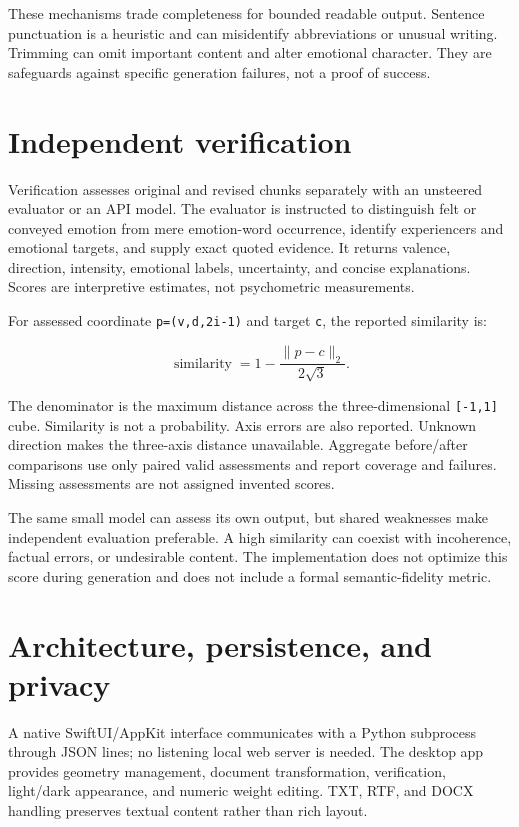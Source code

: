 \documentclass[manuscript,screen,nonacm]{acmart}
\begin{document}
These mechanisms trade completeness for bounded readable output.
Sentence punctuation is a heuristic and can misidentify abbreviations or
unusual writing. Trimming can omit important content and alter emotional
character. They are safeguards against specific generation failures, not
a proof of success.

\section{Independent verification}\label{independent-verification}

Verification assesses original and revised chunks separately with an
unsteered evaluator or an API model. The evaluator is instructed to
distinguish felt or conveyed emotion from mere emotion-word occurrence,
identify experiencers and emotional targets, and supply exact quoted
evidence. It returns valence, direction, intensity, emotional labels,
uncertainty, and concise explanations. Scores are interpretive
estimates, not psychometric measurements.

For assessed coordinate \nolinkurl{p=(v,d,2i-1)} and target \nolinkurl{c}, the
reported similarity is:

\[\operatorname{similarity}=1-\frac{\lVert p-c\rVert_2}{2\sqrt3}.\]

The denominator is the maximum distance across the three-dimensional
\texttt{{[}-1,1{]}} cube. Similarity is not a probability. Axis errors
are also reported. Unknown direction makes the three-axis distance
unavailable. Aggregate before/after comparisons use only paired valid
assessments and report coverage and failures. Missing assessments are
not assigned invented scores.

The same small model can assess its own output, but shared weaknesses
make independent evaluation preferable. A high similarity can coexist
with incoherence, factual errors, or undesirable content. The
implementation does not optimize this score during generation and does
not include a formal semantic-fidelity metric.

\section{Architecture, persistence, and
privacy}\label{architecture-persistence-and-privacy}

A native SwiftUI/AppKit interface communicates with a Python subprocess
through JSON lines; no listening local web server is needed. The desktop
app provides geometry management, document transformation, verification,
light/dark appearance, and numeric weight editing. TXT, RTF, and DOCX
handling preserves textual content rather than rich layout.
\end{document}

